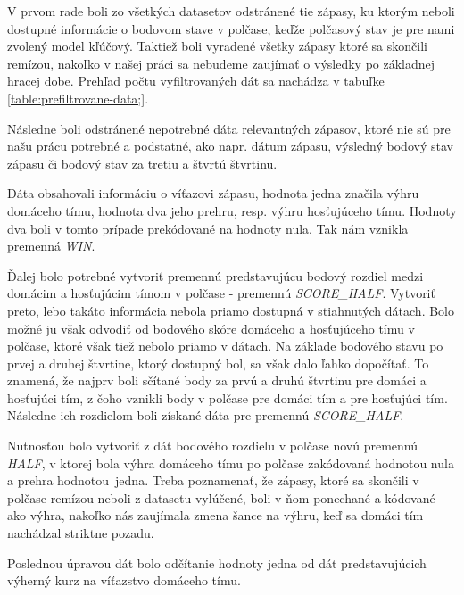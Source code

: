 \documentclass[
  digital, %
  oneside, %
  notable,   %
  lof,     %
  lot,     %
]{fithesis3}
\begin{document}
		V prvom rade boli zo všetkých datasetov odstránené tie zápasy, ku ktorým neboli dostupné informácie o bodovom stave v polčase, keďže polčasový stav je pre nami zvolený model kľúčový. Taktiež boli vyradené všetky zápasy ktoré sa skončili remízou, nakoľko v našej práci sa nebudeme zaujímať o výsledky po základnej hracej dobe. Prehľad počtu vyfiltrovaných dát sa nachádza v tabuľke \ref{table:prefiltrovane-data;}.
		
		Následne boli odstránené nepotrebné dáta relevantných zápasov, ktoré nie sú pre našu prácu potrebné a podstatné, ako napr. dátum zápasu, výsledný bodový stav zápasu či bodový stav za tretiu a štvrtú štvrtinu.
		
		Dáta obsahovali informáciu o víťazovi zápasu, hodnota jedna značila výhru domáceho tímu, hodnota dva jeho prehru, resp. výhru hosťujúceho tímu. Hodnoty dva boli v tomto prípade prekódované na hodnoty nula. Tak nám vznikla premenná \textit{WIN}.
		
		Ďalej bolo potrebné vytvoriť premennú predstavujúcu bodový rozdiel medzi domácim a hosťujúcim tímom v polčase - premennú \textit{SCORE\_HALF}. Vytvoriť preto, lebo takáto informácia nebola priamo dostupná v stiahnutých dátach. Bolo možné ju však odvodiť od  bodového skóre domáceho a hosťujúceho tímu v polčase, ktoré však tiež nebolo priamo v dátach. Na základe bodového stavu po prvej a druhej štvrtine, ktorý dostupný bol, sa však dalo ľahko dopočítať. To znamená, že najprv boli sčítané body za prvú a druhú štvrtinu pre domáci a hosťujúci tím, z čoho vznikli body v polčase pre domáci tím a pre hosťujúci tím. Následne ich rozdielom boli získané dáta pre premennú \textit{SCORE\_HALF}. 
		
		Nutnosťou bolo vytvoriť z dát bodového rozdielu v polčase novú premennú \textit{HALF}, v ktorej bola výhra domáceho tímu po polčase zakódovaná hodnotou nula a prehra hodnotou~jedna. Treba poznamenať, že zápasy, ktoré sa skončili v polčase remízou neboli z datasetu vylúčené, boli v ňom ponechané a kódované ako výhra, nakoľko nás zaujímala zmena šance na výhru, keď sa domáci tím nachádzal striktne pozadu.
		
		Poslednou úpravou dát bolo odčítanie hodnoty jedna od dát predstavujúcich výherný kurz na víťazstvo domáceho tímu.
	
\end{document}
